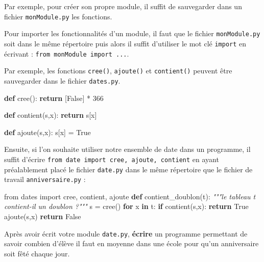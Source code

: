 \documentclass[a4paper,17pt]{extarticle}
\newenvironment{Shaded}{}{}
\newcommand{\KeywordTok}[1]{\textcolor[rgb]{0.00,0.44,0.13}{\textbf{{#1}}}}
\newcommand{\DecValTok}[1]{\textcolor[rgb]{0.25,0.63,0.44}{{#1}}}
\newcommand{\CommentTok}[1]{\textcolor[rgb]{0.38,0.63,0.69}{\textit{{#1}}}}
\newcommand{\NormalTok}[1]{{#1}}
\newcommand{\ImportTok}[1]{{#1}}
\newcommand{\VariableTok}[1]{\textcolor[rgb]{0.10,0.09,0.49}{{#1}}}
\newcommand{\ControlFlowTok}[1]{\textcolor[rgb]{0.00,0.44,0.13}{\textbf{{#1}}}}
\newcommand{\OperatorTok}[1]{\textcolor[rgb]{0.40,0.40,0.40}{{#1}}}
\begin{document}
    Par exemple, pour créer son propre module, il suffit de sauvegarder dans
un fichier \texttt{monModule.py} les fonctions.

Pour importer les fonctionnalités d'un module, il faut que le fichier
\texttt{monModule.py} soit dans le même répertoire puis alors il suffit
d'utiliser le mot clé \texttt{import} en écrivant :
\texttt{from\ monModule\ import\ ...}.

    Par exemple, les fonctions \texttt{cree()}, \texttt{ajoute()} et
\texttt{contient()} peuvent être sauvegarder dans le fichier
\texttt{dates.py}.

\begin{Shaded}
\begin{Highlighting}[]
\KeywordTok{def}\NormalTok{ cree():}
    \ControlFlowTok{return}\NormalTok{ [}\VariableTok{False}\NormalTok{] }\OperatorTok{*} \DecValTok{366}

\KeywordTok{def}\NormalTok{ contient(s,x):}
    \ControlFlowTok{return}\NormalTok{ s[x]}

\KeywordTok{def}\NormalTok{ ajoute(s,x):}
\NormalTok{    s[x] }\OperatorTok{=} \VariableTok{True}
\end{Highlighting}
\end{Shaded}

Ensuite, si l'on souhaite utiliser notre ensemble de date dans un
programme, il suffit d'écrire
\texttt{from\ date\ import\ cree,\ ajoute,\ contient} en ayant
préalablement placé le fichier \texttt{date.py} dans le même répertoire
que le fichier de travail \texttt{anniversaire.py} :

\begin{Shaded}
\begin{Highlighting}[]
\ImportTok{from}\NormalTok{ dates }\ImportTok{import}\NormalTok{ cree, contient, ajoute}
\KeywordTok{def}\NormalTok{ contient\_doublon(t):}
    \CommentTok{"""le tableau t contient{-}il un doublon ?"""}
\NormalTok{    s }\OperatorTok{=}\NormalTok{ cree()}
    \ControlFlowTok{for}\NormalTok{ x }\KeywordTok{in}\NormalTok{ t:}
        \ControlFlowTok{if}\NormalTok{ contient(s,x):}
            \ControlFlowTok{return} \VariableTok{True}
\NormalTok{        ajoute(s,x)}
    \ControlFlowTok{return} \VariableTok{False}
\end{Highlighting}
\end{Shaded}

    Après avoir écrit votre module \texttt{date.py}, \textbf{écrire} un
programme permettant de savoir combien d'élève il faut en moyenne dans
une école pour qu'un anniversaire soit fêté chaque jour.
\end{document}
